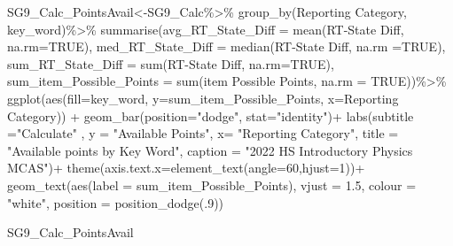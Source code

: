 \documentclass[
  letterpaper,
  DIV=11,
  numbers=noendperiod]{scrartcl}
\newenvironment{Shaded}{\begin{snugshade}}{\end{snugshade}}
\newcommand{\AttributeTok}[1]{\textcolor[rgb]{0.40,0.45,0.13}{#1}}
\newcommand{\ConstantTok}[1]{\textcolor[rgb]{0.56,0.35,0.01}{#1}}
\newcommand{\DecValTok}[1]{\textcolor[rgb]{0.68,0.00,0.00}{#1}}
\newcommand{\FloatTok}[1]{\textcolor[rgb]{0.68,0.00,0.00}{#1}}
\newcommand{\FunctionTok}[1]{\textcolor[rgb]{0.28,0.35,0.67}{#1}}
\newcommand{\NormalTok}[1]{\textcolor[rgb]{0.00,0.23,0.31}{#1}}
\newcommand{\OtherTok}[1]{\textcolor[rgb]{0.00,0.23,0.31}{#1}}
\newcommand{\SpecialCharTok}[1]{\textcolor[rgb]{0.37,0.37,0.37}{#1}}
\newcommand{\StringTok}[1]{\textcolor[rgb]{0.13,0.47,0.30}{#1}}
\begin{document}
\begin{Shaded}
\begin{Highlighting}[]
\NormalTok{SG9\_Calc\_PointsAvail}\OtherTok{\textless{}{-}}\NormalTok{SG9\_Calc}\SpecialCharTok{\%\textgreater{}\%}
  \FunctionTok{group\_by}\NormalTok{(}\StringTok{\textasciigrave{}}\AttributeTok{Reporting Category}\StringTok{\textasciigrave{}}\NormalTok{, }\StringTok{\textasciigrave{}}\AttributeTok{key\_word}\StringTok{\textasciigrave{}}\NormalTok{)}\SpecialCharTok{\%\textgreater{}\%}
  \FunctionTok{summarise}\NormalTok{(}\AttributeTok{avg\_RT\_State\_Diff =} \FunctionTok{mean}\NormalTok{(}\StringTok{\textasciigrave{}}\AttributeTok{RT{-}State Diff}\StringTok{\textasciigrave{}}\NormalTok{, }\AttributeTok{na.rm=}\ConstantTok{TRUE}\NormalTok{),}
            \AttributeTok{med\_RT\_State\_Diff =} \FunctionTok{median}\NormalTok{(}\StringTok{\textasciigrave{}}\AttributeTok{RT{-}State Diff}\StringTok{\textasciigrave{}}\NormalTok{, }\AttributeTok{na.rm =}\ConstantTok{TRUE}\NormalTok{),}
            \AttributeTok{sum\_RT\_State\_Diff =} \FunctionTok{sum}\NormalTok{(}\StringTok{\textasciigrave{}}\AttributeTok{RT{-}State Diff}\StringTok{\textasciigrave{}}\NormalTok{, }\AttributeTok{na.rm=}\ConstantTok{TRUE}\NormalTok{),}
            \AttributeTok{sum\_item\_Possible\_Points =} \FunctionTok{sum}\NormalTok{(}\StringTok{\textasciigrave{}}\AttributeTok{item Possible Points}\StringTok{\textasciigrave{}}\NormalTok{, }\AttributeTok{na.rm =} \ConstantTok{TRUE}\NormalTok{))}\SpecialCharTok{\%\textgreater{}\%}
   \FunctionTok{ggplot}\NormalTok{(}\FunctionTok{aes}\NormalTok{(}\AttributeTok{fill=}\StringTok{\textasciigrave{}}\AttributeTok{key\_word}\StringTok{\textasciigrave{}}\NormalTok{, }\AttributeTok{y=}\NormalTok{sum\_item\_Possible\_Points, }\AttributeTok{x=}\StringTok{\textasciigrave{}}\AttributeTok{Reporting Category}\StringTok{\textasciigrave{}}\NormalTok{)) }\SpecialCharTok{+} \FunctionTok{geom\_bar}\NormalTok{(}\AttributeTok{position=}\StringTok{"dodge"}\NormalTok{, }\AttributeTok{stat=}\StringTok{"identity"}\NormalTok{)}\SpecialCharTok{+} 
  \FunctionTok{labs}\NormalTok{(}\AttributeTok{subtitle =}\StringTok{"Calculate"}\NormalTok{ ,}
       \AttributeTok{y =} \StringTok{"Available Points"}\NormalTok{,}
       \AttributeTok{x=} \StringTok{"Reporting Category"}\NormalTok{,}
       \AttributeTok{title =} \StringTok{"Available points by Key Word"}\NormalTok{,}
      \AttributeTok{caption =} \StringTok{"2022 HS Introductory Physics MCAS"}\NormalTok{)}\SpecialCharTok{+}
       \FunctionTok{theme}\NormalTok{(}\AttributeTok{axis.text.x=}\FunctionTok{element\_text}\NormalTok{(}\AttributeTok{angle=}\DecValTok{60}\NormalTok{,}\AttributeTok{hjust=}\DecValTok{1}\NormalTok{))}\SpecialCharTok{+}
   \FunctionTok{geom\_text}\NormalTok{(}\FunctionTok{aes}\NormalTok{(}\AttributeTok{label =} \StringTok{\textasciigrave{}}\AttributeTok{sum\_item\_Possible\_Points}\StringTok{\textasciigrave{}}\NormalTok{), }\AttributeTok{vjust =} \FloatTok{1.5}\NormalTok{, }\AttributeTok{colour =} \StringTok{"white"}\NormalTok{, }\AttributeTok{position =} \FunctionTok{position\_dodge}\NormalTok{(.}\DecValTok{9}\NormalTok{))}

\NormalTok{SG9\_Calc\_PointsAvail}
\end{Highlighting}
\end{Shaded}
\end{document}
